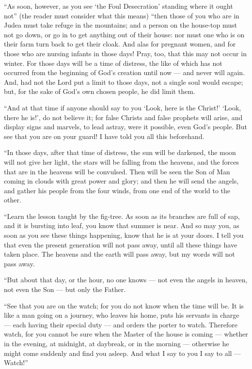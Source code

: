  ``As soon, however, as you see `the Foul Desecration'
standing where it ought not'' (the reader must consider what this means)
``then those of you who are in Judea must take refuge in the mountains;
 and a person on the house-top must not go down, or go in
to get anything out of their house:  nor must one who is on
their farm turn back to get their cloak.  And alas for
pregnant women, and for those who are nursing infants in those days!
 Pray, too, that this may not occur in winter.
 For those days will be a time of distress, the like of
which has not occurred from the beginning of God's creation until now
--- and never will again.  And, had not the Lord put a
limit to those days, not a single soul would escape; but, for the sake
of God's own chosen people, he did limit them.

 ``And at that time if anyone should say to you `Look, here
is the Christ!' `Look, there he is!', do not believe it; 
for false Christs and false prophets will arise, and display signs and
marvels, to lead astray, were it possible, even God's people.
 But see that you are on your guard! I have told you all
this beforehand.

 ``In those days, after that time of distress, the sun will
be darkened, the moon will not give her light,  the stars
will be falling from the heavens, and the forces that are in the heavens
will be convulsed.  Then will be seen the Son of Man coming
in clouds with great power and glory;  and then he will
send the angels, and gather his people from the four winds, from one end
of the world to the other.

 ``Learn the lesson taught by the fig-tree. As soon as its
branches are full of sap, and it is bursting into leaf, you know that
summer is near.  And so may you, as soon as you see these
things happening, know that he is at your doors.  I tell
you that even the present generation will not pass away, until all these
things have taken place.  The heavens and the earth will
pass away, but my words will not pass away.

 ``But about that day, or the hour, no one knows --- not
even the angels in heaven, not even the Son --- but only the Father.

 ``See that you are on the watch; for you do not know when
the time will be.  It is like a man going on a journey, who
leaves his home, puts his servants in charge --- each having their
special duty --- and orders the porter to watch.  Therefore
watch, for you cannot be sure when the Master of the house is coming ---
whether in the evening, at midnight, at daybreak, or in the morning ---
 otherwise he might come suddenly and find you asleep.
 And what I say to you I say to all --- Watch!''

